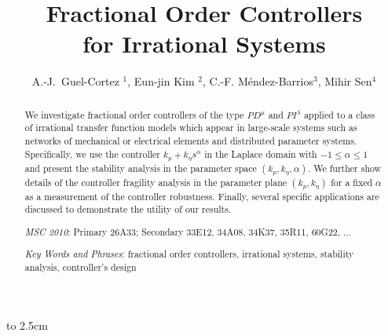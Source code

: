 \documentclass[twoside,reqno,11pt]{fcaa-var} %
\title[Fractional Order Controllers for IS]{Fractional Order Controllers  \\ [3pt] for Irrational Systems}
\author[\normalsize A.-J. Guel-Cortez, Eun-jin Kim, et al.]{\normalsize A.-J.\ Guel-Cortez $^1$, Eun-jin Kim $^2$, C.-F. M\'{e}ndez-Barrios$^3$, Mihir Sen$^4$}
\begin{document}
 \vbox to 2.5cm { \vfill }


 \bigskip \medskip

 \begin{abstract}
 	We investigate fractional order controllers of the type $PD^\mu$ and $PI^\lambda$ applied to a class of irrational transfer function models which appear in large-scale systems such as networks of mechanical or electrical elements and distributed parameter systems. Specifically, we use the controller $k_p+k_\eta s^\alpha$ in the Laplace domain with $-1\leq\alpha\leq1$ and present the stability analysis in the parameter space $(k_p,k_\eta,\alpha)$. We further show details of the controller fragility analysis in the parameter plane $(k_p,k_\eta)$ for a fixed $\alpha$ as a measurement of the controller robustness. Finally, several specific applications are discussed to demonstrate the utility of our results.

 \medskip

{\it MSC 2010\/}: Primary 26A33;
                  Secondary 33E12, 34A08, 34K37, 35R11, 60G22, ...

 \smallskip

{\it Key Words and Phrases}: fractional order controllers, irrational systems, stability analysis, controller's design

 \end{abstract}

 \maketitle

 \vspace*{-16pt}


\end{document}
